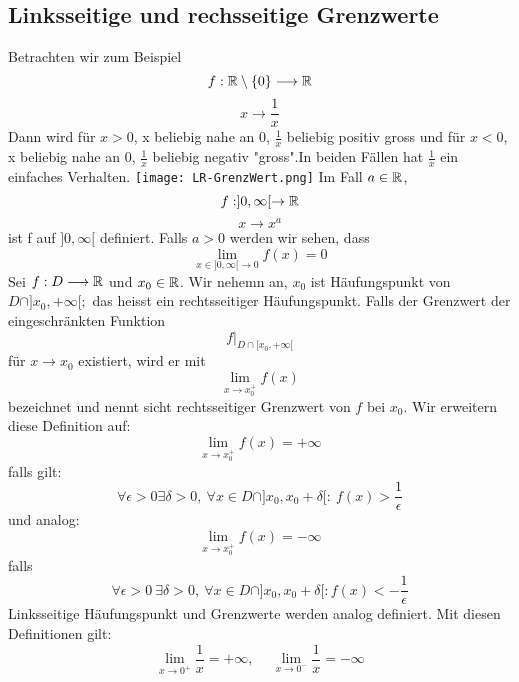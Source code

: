 \subsection{Linksseitige und rechsseitige Grenzwerte}
Betrachten wir zum Beispiel
\[f: \mathbb{R} \setminus \{0\} \longrightarrow \mathbb{R}\]
\[x \longrightarrow \frac{1}{x}\]
Dann wird für \( x > 0\), x beliebig nahe an 0, \(\frac{1}{x}\) beliebig positiv gross und für \(x < 0\), x beliebig nahe an 0, \( \frac{1}{x}\) beliebig negativ "gross".In beiden Fällen hat \( \frac{1}{x}\) ein einfaches Verhalten. \newline
\texttt{[image: LR-GrenzWert.png]} \newline
Im Fall \(a \in \mathbb{R}\),
\[f: ]0,\infty[ \rightarrow \mathbb{R}\]
\[x \rightarrow x^a\]
ist f auf \(]0,\infty[\) definiert. Falls \(a > 0\) werden wir sehen, dass
\[ \lim_{x\in ]0,\infty[\rightarrow 0} f(x) = 0\]
Sei \(f: D \longrightarrow \mathbb{R} \) und \(x_0 \in \mathbb{R} \). Wir nehemn an, \(x_0\) ist Häufungspunkt von \(D \cap ]x_0, +\infty[;\)
das heisst ein rechtsseitiger Häufungspunkt. Falls der Grenzwert der eingeschränkten Funktion
\[f|_{D \cap [x_0,+\infty[}\]
für \(x \longrightarrow x_0\) existiert, wird er mit
\[ \lim_{x \rightarrow x_0^+} f(x)\]
bezeichnet und nennt sicht rechtsseitiger Grenzwert von \(f\) bei \(x_0\).\newline \newline
Wir erweitern diese Definition auf:
\[\lim_{x \rightarrow x_0^+} f(x) = +\infty \]
falls gilt:
\[ \forall \epsilon > 0 \exists \delta > 0, \ \forall x \in D \cap ]x_0,x_0 + \delta[:\ f(x) > \frac{1}{\epsilon}\]
und analog:
\[ \lim_{x \rightarrow x_0^+} f(x) = -\infty \]
falls
\[ \forall \epsilon > 0 \  \exists \delta > 0, \ \forall x \in D \cap ]x_0,x_0+\delta[: f(x) < -\frac{1}{\epsilon}\]
Linksseitige Häufungspunkt und Grenzwerte werden analog definiert. Mit diesen Definitionen gilt:
\[\lim_{x \rightarrow 0^+}\frac{1}{x} = +\infty, \quad\ \lim_{x \rightarrow 0^-}\frac{1}{x} = -\infty \]